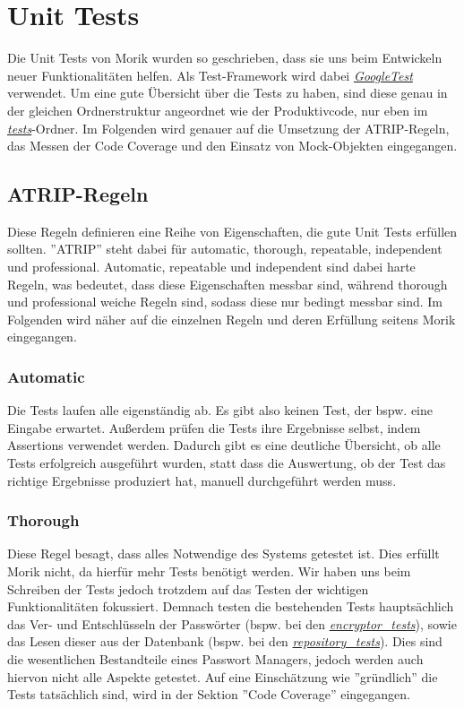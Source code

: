 \chapter{Unit Tests}
Die Unit Tests von Morik wurden so geschrieben, dass sie uns beim Entwickeln neuer Funktionalitäten helfen. Als Test-Framework wird dabei \href{https://github.com/moorts/Morik/blob/main/src/CMakeLists.txt#L24}{\textit{GoogleTest}} verwendet. Um eine gute Übersicht über die Tests zu haben, sind diese genau in der gleichen Ordnerstruktur angeordnet wie der Produktivcode, nur eben im \href{https://github.com/moorts/Morik/tree/main/src/tests}{\textit{tests}}-Ordner. Im Folgenden wird genauer auf die Umsetzung der ATRIP-Regeln, das Messen der Code Coverage und den Einsatz von Mock-Objekten eingegangen.

\section{ATRIP-Regeln}
Diese Regeln definieren eine Reihe von Eigenschaften, die gute Unit Tests erfüllen sollten. ''ATRIP'' steht dabei für automatic, thorough, repeatable, independent und professional. Automatic, repeatable und independent sind dabei harte Regeln, was bedeutet, dass diese Eigenschaften messbar sind, während thorough und professional weiche Regeln sind, sodass diese nur bedingt messbar sind. Im Folgenden wird näher auf die einzelnen Regeln und deren Erfüllung seitens Morik eingegangen.

\subsection{Automatic}
Die Tests laufen alle eigenständig ab. Es gibt also keinen Test, der bspw. eine Eingabe erwartet. Außerdem prüfen die Tests ihre Ergebnisse selbst, indem Assertions verwendet werden. Dadurch gibt es eine deutliche Übersicht, ob alle Tests erfolgreich ausgeführt wurden, statt dass die Auswertung, ob der Test das richtige Ergebnisse produziert hat, manuell durchgeführt werden muss.

\subsection{Thorough}
Diese Regel besagt, dass alles Notwendige des Systems getestet ist. Dies erfüllt Morik nicht, da hierfür mehr Tests benötigt werden. Wir haben uns beim Schreiben der Tests jedoch trotzdem auf das Testen der wichtigen Funktionalitäten fokussiert. Demnach testen die bestehenden Tests hauptsächlich das Ver- und Entschlüsseln der Passwörter (bspw. bei den \href{https://github.com/moorts/Morik/blob/main/src/tests/application/encryptor_tests.cpp}{\textit{encryptor\_tests}}), sowie das Lesen dieser aus der Datenbank (bspw. bei den \href{https://github.com/moorts/Morik/blob/main/src/tests/application/repository_tests.cpp}{\textit{repository\_tests}}). Dies sind die wesentlichen Bestandteile eines Passwort Managers, jedoch werden auch hiervon nicht alle Aspekte getestet. Auf eine Einschätzung wie ''gründlich'' die Tests tatsächlich sind, wird in der Sektion ''Code Coverage'' eingegangen.

